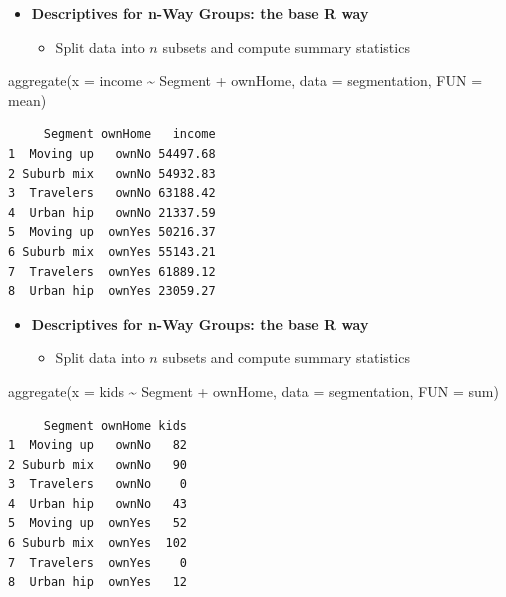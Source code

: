 \documentclass[
  ignorenonframetext,
]{beamer}
\newenvironment{Shaded}{\begin{snugshade}}{\end{snugshade}}
\newcommand{\AttributeTok}[1]{\textcolor[rgb]{0.40,0.45,0.13}{#1}}
\newcommand{\FunctionTok}[1]{\textcolor[rgb]{0.28,0.35,0.67}{#1}}
\newcommand{\NormalTok}[1]{\textcolor[rgb]{0.00,0.23,0.31}{#1}}
\newcommand{\SpecialCharTok}[1]{\textcolor[rgb]{0.37,0.37,0.37}{#1}}
\providecommand{\tightlist}{%
  \setlength{\itemsep}{0pt}\setlength{\parskip}{0pt}}\usepackage{longtable,booktabs,array}
\begin{document}
\begin{frame}[fragile]{}
\label{section-7}
\begin{itemize}
\item
  \textbf{Descriptives for n-Way Groups: the base R way}

  \begin{itemize}
  \tightlist
  \item
    Split data into \(n\) subsets and compute summary statistics
  \end{itemize}
\end{itemize}

\tiny

\begin{Shaded}
\begin{Highlighting}[]
\FunctionTok{aggregate}\NormalTok{(}\AttributeTok{x =}\NormalTok{ income }\SpecialCharTok{\textasciitilde{}}\NormalTok{ Segment }\SpecialCharTok{+}\NormalTok{ ownHome, }
          \AttributeTok{data =}\NormalTok{ segmentation, }\AttributeTok{FUN =}\NormalTok{ mean)}
\end{Highlighting}
\end{Shaded}

\begin{verbatim}
     Segment ownHome   income
1  Moving up   ownNo 54497.68
2 Suburb mix   ownNo 54932.83
3  Travelers   ownNo 63188.42
4  Urban hip   ownNo 21337.59
5  Moving up  ownYes 50216.37
6 Suburb mix  ownYes 55143.21
7  Travelers  ownYes 61889.12
8  Urban hip  ownYes 23059.27
\end{verbatim}
\end{frame}

\begin{frame}[fragile]{}
\label{section-8}
\begin{itemize}
\item
  \textbf{Descriptives for n-Way Groups: the base R way}

  \begin{itemize}
  \tightlist
  \item
    Split data into \(n\) subsets and compute summary statistics
  \end{itemize}
\end{itemize}

\tiny

\begin{Shaded}
\begin{Highlighting}[]
\FunctionTok{aggregate}\NormalTok{(}\AttributeTok{x =}\NormalTok{ kids }\SpecialCharTok{\textasciitilde{}}\NormalTok{ Segment }\SpecialCharTok{+}\NormalTok{ ownHome, }
          \AttributeTok{data =}\NormalTok{ segmentation, }\AttributeTok{FUN =}\NormalTok{ sum)}
\end{Highlighting}
\end{Shaded}

\begin{verbatim}
     Segment ownHome kids
1  Moving up   ownNo   82
2 Suburb mix   ownNo   90
3  Travelers   ownNo    0
4  Urban hip   ownNo   43
5  Moving up  ownYes   52
6 Suburb mix  ownYes  102
7  Travelers  ownYes    0
8  Urban hip  ownYes   12
\end{verbatim}
\end{frame}
\end{document}
